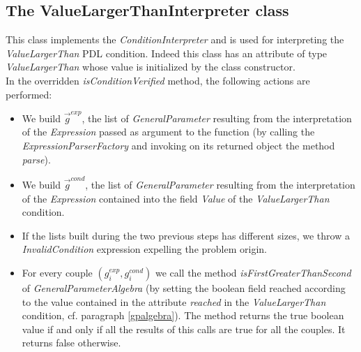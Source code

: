 \documentclass[a4paper,11pt] {ivoa}
\begin{document}
\subsection{The ValueLargerThanInterpreter class}
This class implements the  {\it ConditionInterpreter} and is used for interpreting the {\it ValueLargerThan} PDL condition. Indeed this class has an attribute of type {\it ValueLargerThan} whose value is initialized by the class constructor. \\
In the overridden {\it isConditionVerified} method, the following actions are performed:
\begin{itemize}
\item We build $\vec g^{exp}$, the list of {\it GeneralParameter} resulting from the interpretation of the {\it Expression} passed as argument to the function (by calling the {\it ExpressionParserFactory} and invoking on its returned object the method {\it parse}).
\item We build $\vec g^{cond}$, the list of {\it GeneralParameter} resulting from the interpretation of the {\it Expression} contained into the field {\it Value} of the {\it ValueLargerThan} condition.
\item If the lists built during the two previous steps has different sizes, we throw a {\it InvalidCondition} expression expelling the problem origin. 
\item For every couple $(g_i^{exp}, g_i^{cond})$ we call the method  {\it isFirstGreaterThanSecond} of {\it GeneralParameterAlgebra} (by setting the boolean field reached according to the value contained in the attribute {\it reached} in the  {\it ValueLargerThan} condition, cf. paragraph \ref{gpalgebra}). The method returns the true boolean value if and only if all the results of this calls are true for all the couples. It returns false otherwise. 
\end{itemize}
\end{document}
